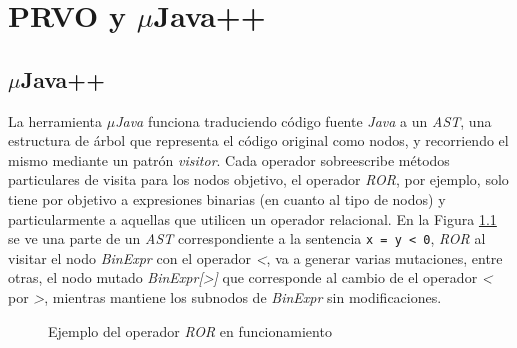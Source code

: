 \chapter[Implementaci\'on]{PRVO y $\mu$Java++}
\label{cap:implementation}

\section{$\mu$Java++}

La herramienta \emph{$\mu$Java} \cite{bibliography.mutation.tools.muJavaMaOK05} funciona traduciendo c\'odigo fuente \emph{Java} a un \emph{AST}, una estructura de \'arbol que representa el c\'odigo original como nodos, y recorriendo el mismo mediante un patr\'on \emph{visitor}. Cada operador sobreescribe m\'etodos particulares de visita para los nodos objetivo, el operador \emph{ROR}, por ejemplo, solo tiene por objetivo a expresiones binarias (en cuanto al tipo de nodos) y particularmente a aquellas que utilicen un operador relacional. En la Figura \ref{figures.examples.rorMutation} se ve una parte de un \emph{AST} correspondiente a la sentencia \lstinline|x = y < 0|, \emph{ROR} al visitar el nodo \emph{BinExpr} con el operador \emph{<}, va a generar varias mutaciones, entre otras, el nodo mutado \emph{BinExpr[>]} que corresponde al cambio de el operador \emph{<} por \emph{>}, mientras mantiene los subnodos de \emph{BinExpr} sin modificaciones.

\begin{figure}
	\caption{Ejemplo del operador \emph{ROR} en funcionamiento}
	\label{figures.examples.rorMutation}
\end{figure}

